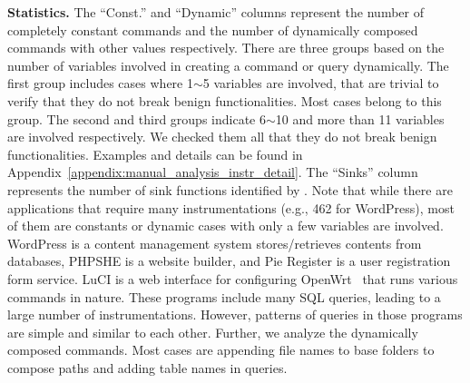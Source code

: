 \noindent
{\bf Statistics.}
The ``Const.'' and ``Dynamic'' columns  represent the number of completely constant commands  and the number of dynamically composed commands with other values respectively. 
There are three groups based on the number of variables involved in creating a command or query dynamically. 
The first group includes cases where 1$\sim$5 variables are involved, that are trivial to verify that they do not break benign functionalities. Most cases belong to this group. 
The second and third groups indicate 6$\sim$10 and more than 11 variables are involved respectively.  
We checked them all that they do not break benign functionalities. Examples and details can be found in Appendix~\ref{appendix:manual_analysis_instr_detail}.
%
The ``Sinks'' column represents the number of sink functions identified by \sysname. 
%
Note that while there are applications that require many instrumentations (e.g., 462 for WordPress), most of them are constants or dynamic cases with only a few variables are involved. 
%
WordPress is a content management system stores/retrieves contents from databases, PHPSHE is a website builder, and Pie Register is a user registration form service. 
LuCI is a web interface for configuring OpenWrt~\cite{openwrt} that runs various commands in nature. 
These programs include many SQL queries, leading to a large number of instrumentations.
However, patterns of queries in those programs  are simple and similar to each other.
Further, we analyze the dynamically composed commands.
Most cases are appending file names to base folders to compose paths and  adding table names in queries. 
%
%
%
%

